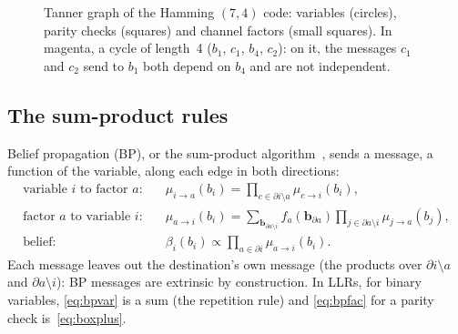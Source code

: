 \documentclass[11pt,a4paper]{article}
\theoremstyle{definition}
\theoremstyle{remark}
\begin{document}
\begin{figure}[htb]
\centering
{}
\caption{Tanner graph of the Hamming $(7,4)$ code: variables (circles), parity checks (squares) and channel factors (small squares). In magenta, a cycle of length~4 ($b_1$, $c_1$, $b_4$, $c_2$): on it, the messages $c_1$ and $c_2$ send to $b_1$ both depend on $b_4$ and are not independent.}
\label{fig:tanner}
\end{figure}

\subsection{The sum-product rules}

Belief propagation (BP), or the sum-product algorithm~\cite{pearl,kschischang}, sends a message, a function of the variable, along each edge in both directions:
\begin{align}
  \text{variable $i$ to factor $a$:}\quad & \mu_{i\to a}(b_i) = \prod_{c\in\partial i\setminus a} \mu_{c\to i}(b_i), \label{eq:bpvar}\\
  \text{factor $a$ to variable $i$:}\quad & \mu_{a\to i}(b_i) = \sum_{\bm{b}_{\partial a\setminus i}} f_a(\bm{b}_{\partial a}) \prod_{j\in\partial a\setminus i} \mu_{j\to a}(b_j), \label{eq:bpfac}\\
  \text{belief:}\quad & \beta_i(b_i) \propto \prod_{a\in\partial i} \mu_{a\to i}(b_i). \label{eq:bpbelief}
\end{align}
Each message leaves out the destination's own message (the products over $\partial i\setminus a$ and $\partial a\setminus i$): BP messages are extrinsic by construction. In LLRs, for binary variables, \eqref{eq:bpvar} is a sum (the repetition rule) and \eqref{eq:bpfac} for a parity check is~\eqref{eq:boxplus}.
\end{document}
